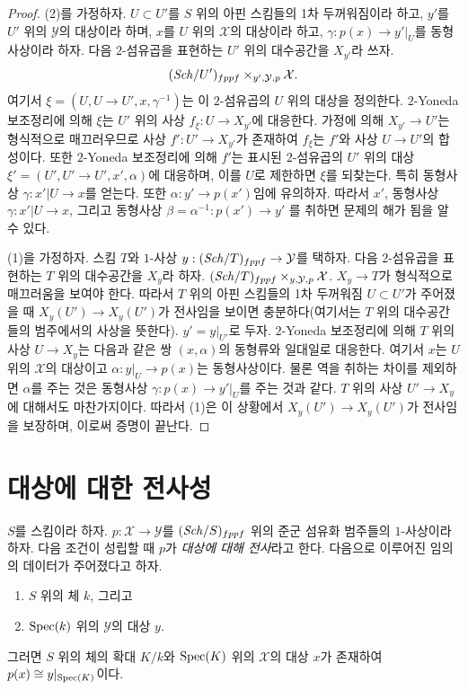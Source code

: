 \begin{proof}
(2)를 가정하자. $U \subset U'$를 $S$ 위의 아핀 스킴들의
1차 두꺼워짐이라 하고, $y'$를 $U'$ 위의 $\mathcal{Y}$의
대상이라 하며, $x$를 $U$ 위의 $\mathcal{X}$의 대상이라 하고,
$\gamma : p(x) \to y'|_U$를 동형사상이라 하자. 다음 $2$-섬유곱을
표현하는 $U'$ 위의 대수공간을 $X_{y'}$라 쓰자.
$$
(\mathit{Sch}/U')_{fppf} \times_{y', \mathcal{Y}, p} \mathcal{X}.
$$
여기서 $\xi = (U, U \to U', x, \gamma^{-1})$는 이 $2$-섬유곱의
$U$ 위의 대상을 정의한다. $2$-Yoneda 보조정리에 의해 $\xi$는
$U'$ 위의 사상 $f_\xi : U \to X_{y'}$에 대응한다.
가정에 의해 $X_{y'} \to U'$는 형식적으로 매끄러우므로 사상
$f' : U' \to X_{y'}$가 존재하여 $f_\xi$는 $f'$와 사상
$U \to U'$의 합성이다. 또한 $2$-Yoneda 보조정리에 의해
$f'$는 표시된 $2$-섬유곱의 $U'$ 위의 대상
$\xi' = (U', U' \to U', x', \alpha)$에 대응하며, 이를 $U$로 제한하면
$\xi$를 되찾는다. 특히 동형사상
$\gamma : x'|U \to x$를 얻는다. 또한
$\alpha : y' \to p(x')$임에 유의하자. 따라서 $x'$, 동형사상
$\gamma : x'|U \to x$, 그리고 동형사상
$\beta = \alpha^{-1} : p(x') \to y'$
를 취하면 문제의 해가 됨을 알 수 있다.

\medskip\noindent
(1)을 가정하자. 스킴 $T$와 $1$-사상
$y : (\mathit{Sch}/T)_{fppf} \to \mathcal{Y}$를 택하자. 다음 $2$-섬유곱을
표현하는 $T$ 위의 대수공간을 $X_y$라 하자.
$(\mathit{Sch}/T)_{fppf} \times_{y, \mathcal{Y}, p} \mathcal{X}$.
$X_y \to T$가 형식적으로 매끄러움을 보여야 한다.
따라서 $T$ 위의 아핀 스킴들의 1차 두꺼워짐
$U \subset U'$가 주어졌을 때 $X_y(U') \to X_y(U')$가
전사임을 보이면 충분하다(여기서는 $T$ 위의 대수공간들의 범주에서의
사상을 뜻한다). $y' = y|_{U'}$로 두자.
$2$-Yoneda 보조정리에 의해 $T$ 위의 사상 $U \to X_y$는 다음과 같은
쌍 $(x, \alpha)$의 동형류와 일대일로 대응한다. 여기서 $x$는
$U$ 위의 $\mathcal{X}$의 대상이고
$\alpha : y|_U \to p(x)$는 동형사상이다. 물론 역을 취하는 차이를
제외하면 $\alpha$를 주는 것은 동형사상
$\gamma : p(x) \to y'|_U$를 주는 것과 같다.
$T$ 위의 사상 $U' \to X_y$에 대해서도 마찬가지이다.
따라서 (1)은 이 상황에서 $X_y(U') \to X_y(U')$가
전사임을 보장하며, 이로써 증명이 끝난다.
\end{proof}







\section{대상에 대한 전사성}
\label{section-formally-surjective}

\noindent
$S$를 스킴이라 하자. $p : \mathcal{X} \to \mathcal{Y}$를
$(\mathit{Sch}/S)_{fppf}$ 위의 준군 섬유화 범주들의 $1$-사상이라 하자.
다음 조건이 성립할 때 $p$가 {\it 대상에 대해 전사}라고 한다.
다음으로 이루어진 임의의 데이터가 주어졌다고 하자.
\begin{enumerate}
\item $S$ 위의 체 $k$, 그리고
\item $\mathop{\mathrm{Spec}}(k)$ 위의 $\mathcal{Y}$의 대상 $y$.
\end{enumerate}
그러면 $S$ 위의 체의 확대 $K/k$와 $\mathop{\mathrm{Spec}}(K)$ 위의
$\mathcal{X}$의 대상 $x$가 존재하여
$p(x) \cong y|_{\mathop{\mathrm{Spec}}(K)}$이다.

